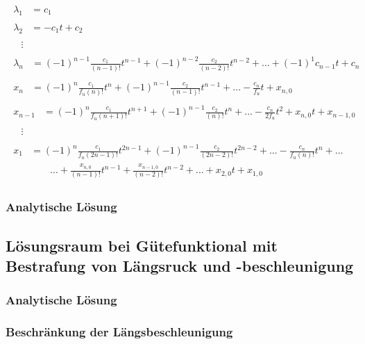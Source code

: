\begin{align}
\begin{split}
\lambda_1 &= c_1 
\end{split}
\\
\begin{split}
\lambda_2 &= -c_1t + c_2 
\end{split}
\\
\begin{split}
&\vdots 
\end{split}
\\
\begin{split}
\lambda_n &= (-1)^{n-1}\frac{c_1}{(n-1)!}t^{n-1} + (-1)^{n-2}\frac{c_2}{(n-2)!}t^{n-2} + ... + (-1)^1c_{n-1}t + c_n 
\end{split}
\\
\begin{split}
x_n &= (-1)^n\frac{c_1}{f_u(n)!}t^{n} + (-1)^{n-1}\frac{c_2}{(n-1)!}t^{n-1} + ... - \frac{c_{n}}{f_u}t + x_{n,0} 
\end{split}
\\
\begin{split}
x_{n-1} &= (-1)^n\frac{c_1}{f_u(n+1)!}t^{n+1} + (-1)^{n-1}\frac{c_2}{(n)!}t^{n} + ... - \frac{c_{n}}{2f_u}t^2 + x_{n,0}t + x_{n-1,0} 
\end{split}
\\
\begin{split}
&\vdots 
\end{split}
\\
\begin{split}
x_{1} &= (-1)^n\frac{c_1}{f_u(2n-1)!}t^{2n-1} + (-1)^{n-1}\frac{c_2}{(2n-2)!}t^{2n-2} + ... - \frac{c_{n}}{f_u(n)!}t^n + ... \\
&\qquad ... + \frac{x_{n,0}}{(n-1)!}t^{n-1} + \frac{x_{n-1,0}}{(n-2)!}t^{n-2} + ... + x_{2,0}t + x_{1,0}
\end{split}
\end{align}
\subsubsection{Analytische Lösung}
\subsection{Lösungsraum bei Gütefunktional mit Bestrafung von Längsruck und -beschleunigung}
\subsubsection{Analytische Lösung}
\subsubsection{Beschränkung der Längsbeschleunigung}
